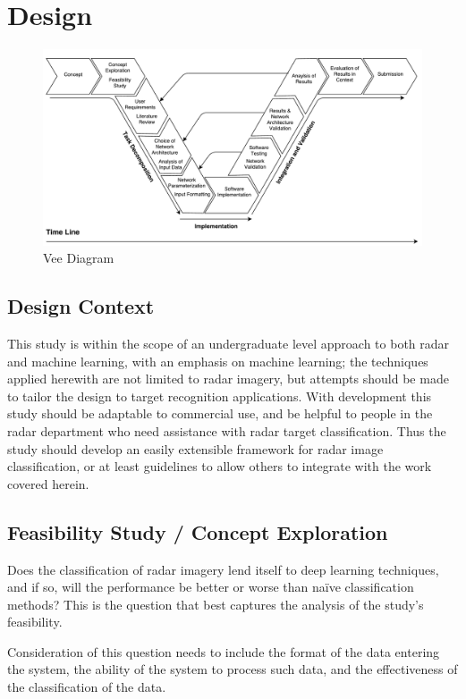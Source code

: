 \chapter{Design}


\begin{figure}[]
\centering
\includegraphics[width=\textwidth]{figures/vee_diagram} %
\caption{Vee Diagram}
\label{fig:vee_diagram}
\centering
\end{figure}



\section{Design Context}
This study is within the scope of an undergraduate level approach to both radar and machine learning, with an emphasis on machine learning; the techniques applied herewith are not limited to radar imagery, but attempts should be made to tailor the design to target recognition applications. With development this study should be adaptable to commercial use, and be helpful to people in the radar department who need assistance with radar target classification. Thus the study should develop an easily extensible framework for radar image classification, or at least guidelines to allow others to integrate with the work covered herein.


\section{Feasibility Study / Concept Exploration}
Does the classification of radar imagery lend itself to deep learning techniques, and if so, will the performance be better or worse than na{\"i}ve classification methods? This is the question that best captures the analysis of the study's feasibility.

Consideration of this question needs to include the format of the data entering the system, the ability of the system to process such data, and the effectiveness of the classification of the data.

